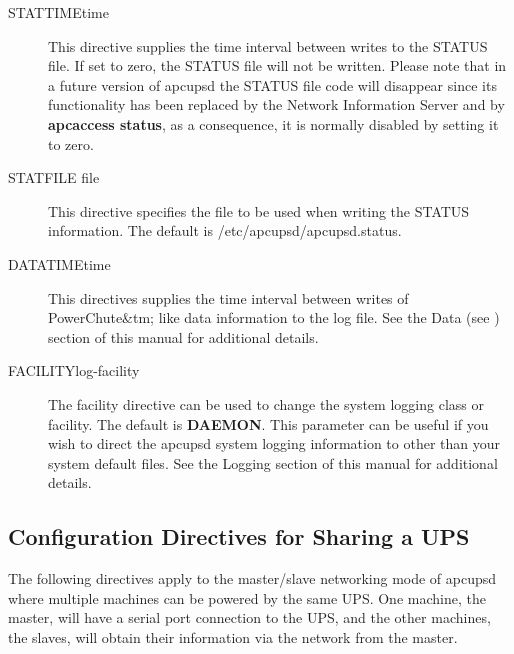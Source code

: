 {{{{{{{{{{{\label{index-Directives-Logging-245}
\label{index-Logging_002c-directives-246}

\begin{description}

\item [STATTIME\lt{}time\gt{}]
   This directive supplies the time interval between writes to the STATUS file.
If set to zero, the STATUS file will not be written. Please note that in a
future version of apcupsd the STATUS file code will disappear since its
functionality has been replaced by the Network Information Server and by {\bf
apcaccess status}, as a consequence, it is normally disabled by setting it to
zero.  

\item [STATFILE \lt{}file\gt{}]
   This directive specifies the file to be used when writing the STATUS
information. The default is /etc/apcupsd/apcupsd.status.  

\item [DATATIME\lt{}time\gt{}]
   This directives supplies the time interval between writes of PowerChute\&tm;
like data information to the log file. See the Data (see 
) section of this manual for
additional details.  

\item [FACILITY\lt{}log-facility\gt{}]
   The facility directive can be used to change the system logging class or
facility. The default is {\bf DAEMON}. This parameter can be useful if you
wish to direct the apcupsd system logging information to other than your
system default files. See the Logging section of this manual for additional
details. 
\end{description}

\label{Configuration-Directives-for-Sharing-a-UPS}

\subsection*{Configuration Directives for Sharing a UPS}

\label{index-Directives-Sharing-247}
The following directives apply to the master/slave networking mode of apcupsd
where multiple machines can be powered by the same UPS. One machine, the
master, will have a serial port connection to the UPS, and the other machines,
the slaves, will obtain their information via the network from the master.  

}}}}}}}}}}}
